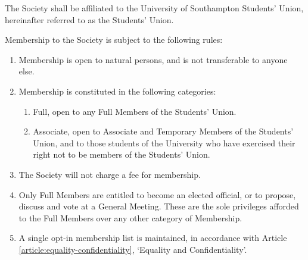 \documentclass[12pt]{constitution}
\begin{document}

\label{article:affiliation}

The Society shall be affiliated to the University of Southampton Students’ Union, hereinafter referred to as the Students’ Union.


\label{article:membership}

Membership to the Society is subject to the following rules:

\begin{enumerate}
    \item Membership is open to natural persons, and is not transferable to anyone else.
    \item Membership is constituted in the following categories:
    \begin{enumerate}
        \item Full, open to any Full Members of the Students' Union.
        \item Associate, open to Associate and Temporary Members of the Students’ Union, and to those students of the University who have exercised their right not to be members of the Students’ Union.
    \end{enumerate}
    \item The Society will not charge a fee for membership.
    \item Only Full Members are entitled to become an elected official, or to propose, discuss and vote at a General Meeting. These are the sole privileges afforded to the Full Members over any other category of Membership.
    \item A single opt-in membership list is maintained, in accordance with Article \ref{article:equality-confidentiality}, `Equality and Confidentiality'.
\end{enumerate}


\label{article:equality-confidentiality}
\end{document}
